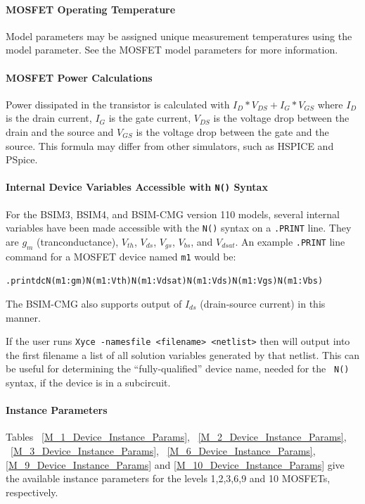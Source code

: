 \paragraph{MOSFET Operating Temperature}
Model parameters may be assigned unique measurement temperatures using the
 model parameter. See the MOSFET model parameters for more
information.

\paragraph{MOSFET Power Calculations}
Power dissipated in the transistor is calculated with $I_{D}*V_{DS}+I_{G}*V_{GS}$ where
$I_{D}$ is the drain current, $I_{G}$ is the gate current, $V_{DS}$ is the
voltage drop between the drain and the source and $V_{GS}$ is the voltage drop
between the gate and the source. This formula may differ from other simulators,
such as HSPICE and PSpice.

\paragraph{Internal Device Variables Accessible with {\tt N()} Syntax}
For the BSIM3, BSIM4, and BSIM-CMG version 110 models, several
internal variables have been made accessible with the {\tt N()} syntax
on a {\tt .PRINT} line.  They are $g_{m}$ (tranconductance), $V_{th}$,
$V_{ds}$, $V_{gs}$, $V_{bs}$, and $V_{dsat}$.  An example {\tt .PRINT}
line command for a MOSFET device named {\tt m1} would be:
\begin{alltt}
.print dc N(m1:gm) N(m1:Vth) N(m1:Vdsat) N(m1:Vds) N(m1:Vgs) N(m1:Vbs)
\end{alltt}
The BSIM-CMG also supports output of $I_{ds}$ (drain-source current)
in this manner.

If the user runs \texttt{Xyce -namesfile <filename> <netlist>} then
\Xyce{} will output into the first filename a list of all solution
variables generated by that netlist. This can be useful for
determining the ``fully-qualified'' device name, needed for the {\tt
  N()} syntax, if the device is in a subcircuit.

\paragraph{Instance Parameters}
Tables ~\ref{M_1_Device_Instance_Params}, ~\ref{M_2_Device_Instance_Params}, 
~\ref{M_3_Device_Instance_Params},  ~\ref{M_6_Device_Instance_Params},
\ref{M_9_Device_Instance_Params} and \ref{M_10_Device_Instance_Params}  
give the available instance parameters for the levels 1,2,3,6,9 and 10 MOSFETs,
respectively.

